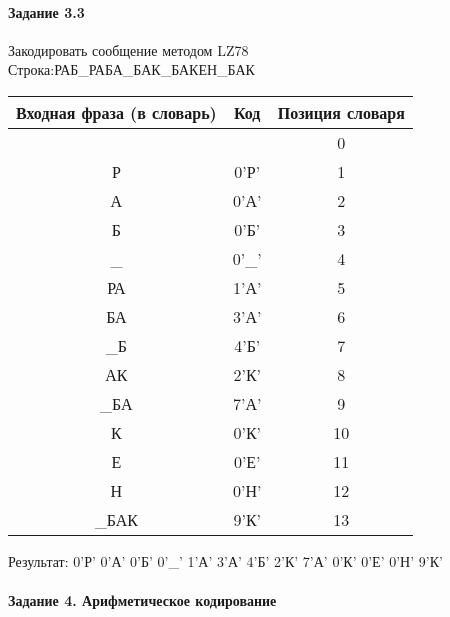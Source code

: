 \documentclass[a4paper, 12pt]{article}
\begin{document}
\paragraph{Задание 3.3}

Закодировать сообщение методом LZ78\\
Строка:РАБ\_РАБА\_БАК\_БАКЕН\_БАК\\
\begin{table}[h!]
\centering
\begin{tabular}{|c|c|c|} 
\hline
 Входная фраза (в словарь) & Код & Позиция словаря \\ \hline

 &  & 0 \\ \hline
Р & 0'Р' & 1 \\ \hline
А & 0'А' & 2 \\ \hline
Б & 0'Б' & 3 \\ \hline
\_ & 0'\_' & 4 \\ \hline
РА & 1'А' & 5 \\ \hline
БА & 3'А' & 6 \\ \hline
\_Б & 4'Б' & 7 \\ \hline
АК & 2'К' & 8 \\ \hline
\_БА & 7'А' & 9 \\ \hline
К & 0'К' & 10 \\ \hline
Е & 0'Е' & 11 \\ \hline
Н & 0'Н' & 12 \\ \hline
\_БАК & 9'К' & 13 \\ \hline
\end{tabular}
\end{table}

Результат: 0'Р' 0'А' 0'Б' 0'\_' 1'А' 3'А' 4'Б' 2'К' 7'А' 0'К' 0'Е' 0'Н' 9'К'\\
\pagebreak
\paragraph{Задание 4. Арифметическое кодирование\\}
\end{document}
